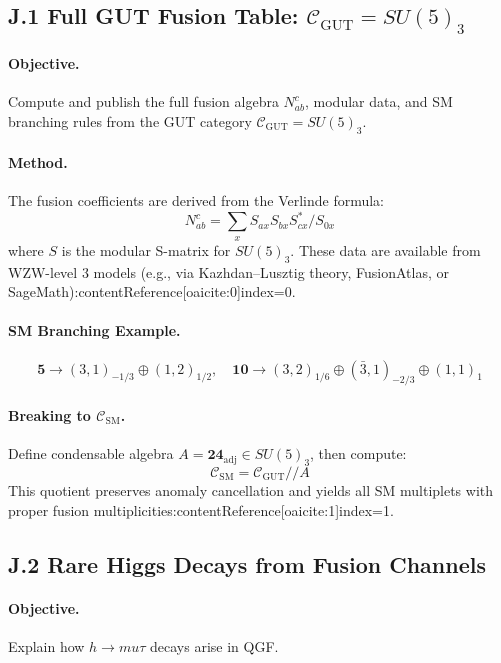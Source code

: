 \documentclass[11pt]{article}
\def\mu{mu}
\def\frac#1#2{#1/#2}
\begin{document}
\subsection*{J.1 Full GUT Fusion Table: \( \mathcal{C}_{\text{GUT}} = SU(5)_3 \)}

\paragraph{Objective.}  
Compute and publish the full fusion algebra \( N_{ab}^c \), modular data, and SM branching rules from the GUT category \( \mathcal{C}_{\text{GUT}} = SU(5)_3 \).

\paragraph{Method.}  
The fusion coefficients are derived from the Verlinde formula:
\[
N_{ab}^c = \sum_x \frac{S_{ax} S_{bx} S_{cx}^*}{S_{0x}}
\]
where \( S \) is the modular S-matrix for \( SU(5)_3 \). These data are available from WZW-level 3 models (e.g., via Kazhdan–Lusztig theory, FusionAtlas, or SageMath):contentReference[oaicite:0]{index=0}.

\paragraph{SM Branching Example.}
\[
\mathbf{5} \to (3,1)_{-1/3} \oplus (1,2)_{1/2}, \quad
\mathbf{10} \to (3,2)_{1/6} \oplus (\bar{3},1)_{-2/3} \oplus (1,1)_1
\]

\paragraph{Breaking to \( \mathcal{C}_{\text{SM}} \).}  
Define condensable algebra \( A = \mathbf{24}_{\text{adj}} \in SU(5)_3 \), then compute:
\[
\mathcal{C}_{\text{SM}} = \mathcal{C}_{\text{GUT}} // A
\]
This quotient preserves anomaly cancellation and yields all SM multiplets with proper fusion multiplicities:contentReference[oaicite:1]{index=1}.

\subsection*{J.2 Rare Higgs Decays from Fusion Channels}

\paragraph{Objective.}  
Explain how \( h \to \mu \tau \) decays arise in QGF.
\end{document}
